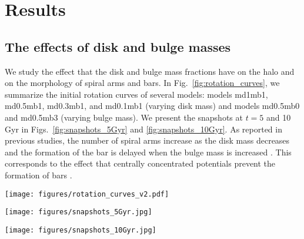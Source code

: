 

\section{Results}

\subsection{The effects of disk and bulge masses}

We study the effect that the disk and bulge mass fractions have on the halo
and on the morphology of spiral arms and bars.  In
Fig.~\ref{fig:rotation_curves}, we summarize the initial 
rotation curves of
several models: models md1mb1, md0.5mb1, md0.3mb1, and md0.1mb1
(varying disk mass) and models md0.5mb0 and md0.5mb3 (varying bulge
mass).  We present the snapshots at $t=5$ and 10\,Gyr in
Figs.~\ref{fig:snapshots_5Gyr} and \ref{fig:snapshots_10Gyr}.  As
reported in previous studies, the number of spiral arms increase as
the disk mass decreases
\citep{1985ApJ...298..486C,2003MNRAS.344..358B,
2011ApJ...730..109F,2015ApJ...808L...8D}
and the formation of the bar is delayed when the bulge mass is increased
\citep{2013MNRAS.434.1287S}. This corresponds to the effect that
centrally concentrated potentials prevent the formation of bars
\citep{2001ApJ...546..176S}.


\begin{figure*}
\texttt{[image: figures/rotation\_curves\_v2.pdf]}
    \caption{Rotation curves of the initial conditions for models 
      md1mb1, md0.5mb1, md0.3mb1, md0.1mb1, md0.5mb0, and md0.5mb3\label{fig:rotation_curves}.
      The gray solid, dotted, dashed, and dot-dashed curves indicate disk, bulge, halo, and total rotation curves of model md1mb1.}
\end{figure*}

\begin{figure*}
\texttt{[image: figures/snapshots\_5Gyr.jpg]}
    \caption{Snapshots (surface densities) at $t=5$ Gyr for models 
      md1mb1, md0.5mb1, md0.3mb1, md0.1mb1, md0.5mb0, and md0.5mb3.
      \label{fig:snapshots_5Gyr}}
\end{figure*}

\begin{figure*}
\texttt{[image: figures/snapshots\_10Gyr.jpg]}
    \caption{Snapshots (surface densities) at $t=10$ Gyr for models 
      md1mb1, md0.5mb1, md0.3mb1, md0.1mb1, md0.5mb0, and md0.5mb3.
      \label{fig:snapshots_10Gyr}}
\end{figure*}






